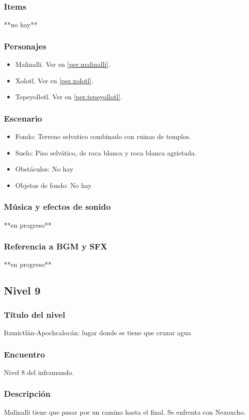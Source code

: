 \documentclass[11pt,letterpaper]{article}
\begin{document}
	\subsubsection{Items}
	**no hay**
	\subsubsection{Personajes}
	\begin{itemize}
		\item Malinalli. Ver en \ref{per.malinalli}. 
		\item Xolotl. Ver en \ref{per.xolotl}.
		\item Tepeyollotl. Ver en \ref{per.tepeyollotl}.
	\end{itemize}
	\subsubsection{Escenario}
\begin{itemize} 
	\item Fondo: Terreno selvatico combinado con ruinas de templos.
	\item Suelo: Piso selvático, de roca blanca y roca blanca agrietada.
	\item Obstáculos: No hay
	\item Objetos de fondo: No hay
\end{itemize}		
	\subsubsection{Música y efectos de sonido}
	**en progreso**
	\subsubsection{Referencia a BGM y SFX}
	**en progreso**
	
		\subsection{Nivel 9}
	\subsubsection{Título del nivel}
	Itzmictlán-Apochcalocán: lugar donde se tiene que cruzar agua
	\subsubsection{Encuentro}
	Nivel 8 del inframundo.
	\subsubsection{Descripción}
	Malinalli tiene que pasar por un camino hasta el final. Se enfrenta con Nexoxcho.
\end{document}
